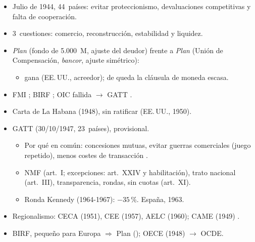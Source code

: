 \documentclass{article}
\begin{document}
\begin{columnas}
\begin{itemize}
\item Julio de 1944, 44~países: evitar proteccionismo, devaluaciones competitivas y falta de cooperación.
\item 3~cuestiones: comercio, reconstrucción, estabilidad y liquidez.
\item \emph{Plan } (fondo de 5.000~M, ajuste del deudor) frente a \emph{Plan } (Unión de Compensación, \emph{bancor}, ajuste simétrico):
  \begin{itemize}
  \item gana  (EE.\,UU., acreedor); de  queda la cláusula de moneda escasa.
  \end{itemize}
\end{itemize}
\begin{itemize}
\item FMI ; BIRF ; OIC fallida $\to$ GATT .
\end{itemize}
\begin{itemize}
\item Carta de La Habana (1948), sin ratificar (EE.\,UU., 1950).
\item GATT (30/10/1947, 23~países), provisional.
  \begin{itemize}
  \item Por qué en común: concesiones mutuas, evitar guerras comerciales (juego repetido), menos costes de transacción .
  \end{itemize}
  \begin{itemize}
  \item NMF (art.~I; excepciones: art.~XXIV y habilitación), trato nacional (art.~III), transparencia, rondas, sin cuotas (art.~XI).
  \item Ronda Kennedy (1964-1967): $-35$\,\%. España, 1963.
  \end{itemize}
\item Regionalismo: CECA (1951), CEE (1957), AELC (1960); CAME (1949) .
\end{itemize}
\begin{itemize}
\item BIRF, pequeño para Europa $\Rightarrow$ Plan  (); OECE (1948) $\to$ OCDE.

\end{itemize}
\end{columnas}
\end{document}
